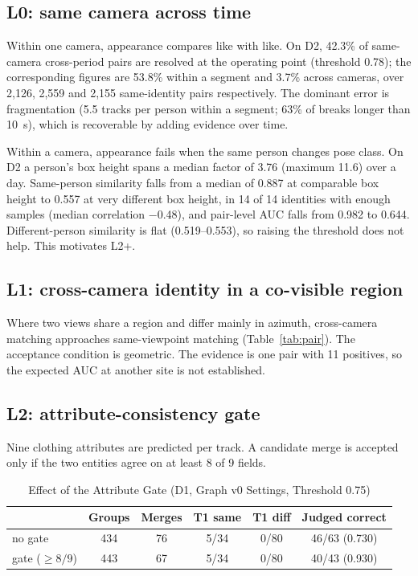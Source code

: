 \documentclass[journal]{IEEEtran}
\begin{document}
\subsection{L0: same camera across time}
Within one camera, appearance compares like with like. On D2, 42.3\% of same-camera cross-period pairs are resolved at the operating point (threshold 0.78); the corresponding figures are 53.8\% within a segment and 3.7\% across cameras, over 2,126, 2,559 and 2,155 same-identity pairs respectively. The dominant error is fragmentation (5.5 tracks per person within a segment; 63\% of breaks longer than 10~s), which is recoverable by adding evidence over time.

Within a camera, appearance fails when the same person changes pose class. On D2 a person's box height spans a median factor of 3.76 (maximum 11.6) over a day. Same-person similarity falls from a median of 0.887 at comparable box height to 0.557 at very different box height, in 14 of 14 identities with enough samples (median correlation $-$0.48), and pair-level AUC falls from 0.982 to 0.644. Different-person similarity is flat (0.519--0.553), so raising the threshold does not help. This motivates L2+.

\subsection{L1: cross-camera identity in a co-visible region}
Where two views share a region and differ mainly in azimuth, cross-camera matching approaches same-viewpoint matching (Table~\ref{tab:pair}). The acceptance condition is geometric. The evidence is one pair with 11 positives, so the expected AUC at another site is not established.

\subsection{L2: attribute-consistency gate}\label{sec:l2}
Nine clothing attributes are predicted per track. A candidate merge is accepted only if the two entities agree on at least 8 of 9 fields.

\begin{table}[t]
\caption{Effect of the Attribute Gate (D1, Graph v0 Settings, Threshold 0.75)}\label{tab:gate}
\centering
\setlength{\tabcolsep}{3.5pt}
\begin{tabular}{@{}lccccc@{}}
\toprule
 & Groups & Merges & T1 same & T1 diff & Judged correct\\
\midrule
no gate & 434 & 76 & 5/34 & 0/80 & 46/63 (0.730)\\
gate ($\ge 8/9$) & 443 & 67 & 5/34 & 0/80 & 40/43 (0.930)\\
\bottomrule
\end{tabular}
\end{table}
\end{document}
